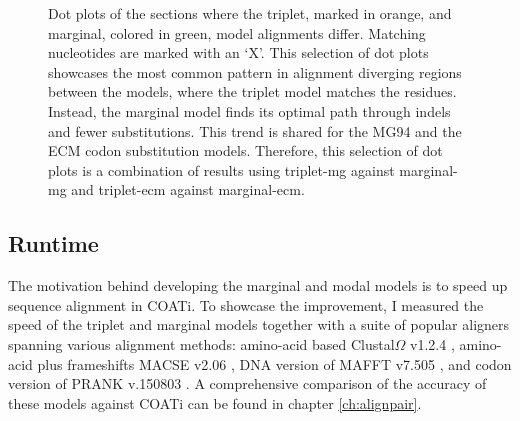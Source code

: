 \begin{figure}[!ht]
 \centering
 \begin{multicols}{2}
\scalebox{0.52}{}
\vspace{0.5em}

\scalebox{0.52}{}
\vspace{0.5em}

\scalebox{0.42}{}
\columnbreak

\scalebox{0.40}{}
\vspace{0.5em}

\scalebox{0.40}{}
\vspace{0.5em}

\scalebox{0.34}{}
\end{multicols}
 \vspace{1mm}
 \caption[Dot Plot Triplet vs. Marginal]{Dot plots of the sections where the triplet, marked in orange, and marginal, colored in green, model alignments differ. Matching nucleotides are marked with an `X'. This selection of dot plots showcases the most common pattern in alignment diverging regions between the models, where the triplet model matches the residues. Instead, the marginal model finds its optimal path through indels and fewer substitutions. This trend is shared for the MG94 and the ECM codon substitution models. Therefore, this selection of dot plots is a combination of results using triplet-mg against marginal-mg and triplet-ecm against marginal-ecm.}
 \label{fig:dotplots}
\end{figure}

\clearpage

\subsection{Runtime} %
The motivation behind developing the marginal and modal models is to speed up sequence alignment in COATi. To showcase the improvement, I measured the speed of the triplet and marginal models together with a suite of popular aligners spanning various alignment methods: amino-acid based Clustal$\Omega$ v1.2.4 \citep{clustal_omega_sievers_2011}, amino-acid plus frameshifts MACSE v2.06 \citep{ranwez_macse_2011}, DNA version of MAFFT v7.505 \citep{katoh2013mafft}, and codon version of PRANK v.150803 \citep{prank_loytynoja_2014}. A comprehensive comparison of the accuracy of these models against COATi can be found in chapter \ref{ch:alignpair}.

